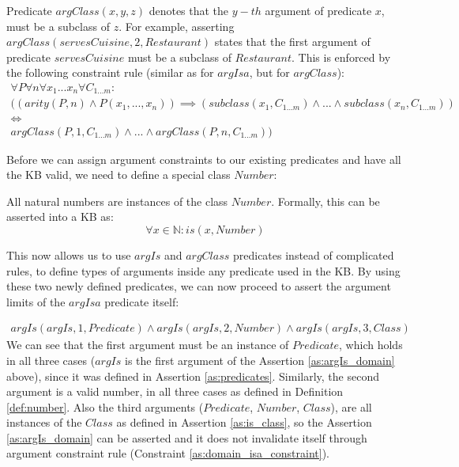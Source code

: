 \begin{definition}\label{def:pred_argClass}
Predicate $argClass(x,y,z)$ denotes that the $y-th$ argument of predicate $x$, 
must be a subclass of $z$. For example, asserting 
\\$argClass(servesCuisine, 2, Restaurant)$ states that the first argument of 
predicate $servesCuisine$ must be a subclass of $Restaurant$.
This is enforced by the following constraint rule (similar as for $argIsa$, but
for $argClass$):
\begin{equation}\label{as:domain_class_constraint}
\begin{gathered}
  \forall P \forall n \forall x_1...x_n \forall C_{1...m}: \\
  ((arity(P,n) \land P(x_1,...,x_n)) \implies (subclass(x_1,C_{1...m}) \land ... \land subclass(x_n,C_{1...m})) \\ 
  \iff \\
  argClass(P,1,C_{1...m}) \land ... \land argClass(P,n,C_{1...m}))
\end{gathered}
\end{equation}
\end{definition}

Before we can assign argument constraints to our existing predicates and have
all the KB valid, we need to define a special class $Number$:

\begin{definition}\label{def:number}
All natural numbers are instances of the class $Number$. Formally, this can be
asserted into a KB as:
\begin{equation}\label{as:numbers}
	\forall x \in \mathbb{N}:is(x,Number)
\end{equation}
\end{definition}

This now allows us to use $argIs$ and $argClass$ predicates instead of 
complicated rules, to define types of arguments inside any predicate used in the
KB. By using these two newly defined predicates, we can now proceed to assert 
the argument limits of the $argIsa$ predicate itself: 

\begin{equation}\label{as:argIs_domain}
\begin{gathered}
argIs(argIs,1,Predicate) \land argIs(argIs,2,Number) \land argIs(argIs,3,Class) 
\end{gathered}
\end{equation}
We can see that the first argument must be an instance of $Predicate$, which 
holds in all three cases ($argIs$ is the first argument of the Assertion 
\ref{as:argIs_domain} above), since it was defined in Assertion 
\ref{as:predicates}. Similarly, the second argument is a valid number, in all 
three cases as defined in Definition \ref{def:number}. Also the third arguments
($Predicate$, $Number$, $Class$), are all instances of the $Class$ as defined in
Assertion \ref{as:is_class}, so the Assertion \ref{as:argIs_domain} can be asserted and it does not invalidate itself through argument constraint rule (Constraint \ref{as:domain_isa_constraint}).

